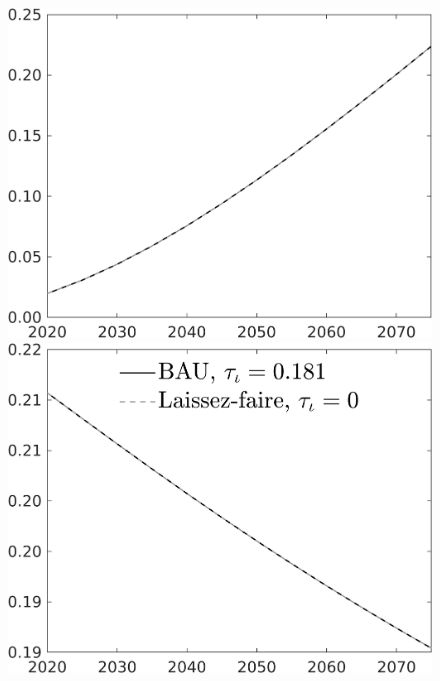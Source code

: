 \documentclass[12pt]{article}
\begin{document}
\begin{figure}[h!!]
\begin{minipage}[]{0.32\textwidth}
	\end{minipage}	
		\begin{minipage}[]{0.32\textwidth}
			\includegraphics[width=1\textwidth]{../../codding_model/own_basedOnFried/optimalPol_010922_revision/figures/all_13Sept22/CompTaul_Equlab_LFBAU_Reg0_AgAf_spillover0_nsk1_xgr1_knspil0_sep1_countec0_GovRev0_etaa0.79_lgd0.png}
		\end{minipage}
	\begin{minipage}[]{0.32\textwidth}
		\includegraphics[width=1\textwidth]{../../codding_model/own_basedOnFried/optimalPol_010922_revision/figures/all_13Sept22/CompTaul_Equlab_LFBAU_Reg0_pf_spillover0_nsk1_xgr1_knspil0_sep1_countec0_GovRev0_etaa0.79_lgd1.png}

\end{minipage}
\end{figure}
\end{document}
